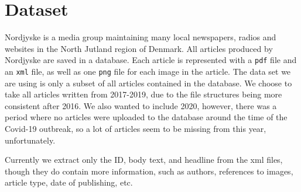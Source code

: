 \section{Dataset}
Nordjyske is a media group maintaining many local newspapers, radios and websites in the North Jutland region of Denmark.
All articles produced by Nordjyske are saved in a database.
Each article is represented with a \texttt{pdf} file and an \texttt{xml} file, as well as one \texttt{png} file for each image in the article.
The data set we are using is only a subset of all articles contained in the database.
We choose to take all articles written from 2017-2019, due to the file structures being more consistent after 2016.
We also wanted to include 2020, however, there was a period where no articles were uploaded to the database around the time of the Covid-19 outbreak, so a lot of articles seem to be missing from this year, unfortunately.

Currently we extract only the ID, body text, and headline from the xml files, though they do contain more information, such as authors, references to images, article type, date of publishing, etc.
